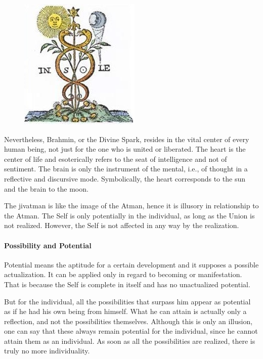 \begin{figure}
\includegraphics[scale=0.65]{a20220928SacredScience103TheVitalCenter-img002.jpg} 
\end{figure}
 
Nevertheless, Brahmin, or the Divine Spark, resides in the vital center of every human being, not just for the one who is united or liberated. The heart is the center of life and esoterically refers to the seat of intelligence and not of sentiment. The brain is only the instrument of the mental, i.e., of thought in a reflective and discursive mode. Symbolically, the heart corresponds to the sun and the brain to the moon.

The jivatman is like the image of the Atman, hence it is illusory in relationship to the Atman. The Self is only potentially in the individual, as long as the Union is not realized. However, the Self is not affected in any way by the realization.

\paragraph{Possibility and Potential}
Potential means the aptitude for a certain development and it supposes a possible actualization. It can be applied only in regard to becoming or manifestation. That is because the Self is complete in itself and has no unactualized potential.

But for the individual, all the possibilities that surpass him appear as potential as if he had his own being from himself. What he can attain is actually only a reflection, and not the possibilities themselves. Although this is only an illusion, one can say that these always remain potential for the individual, since he cannot attain them as an individual. As soon as all the possibilities are realized, there is truly no more individuality.


